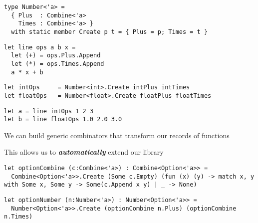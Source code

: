 \documentclass{beamer}
\begin{document}
\begin{frame}[fragile]
\begin{lstlisting}
type Number<'a> = 
  { Plus  : Combine<'a>
    Times : Combine<'a> }
  with static member Create p t = { Plus = p; Times = t }
\end{lstlisting}
\end{frame}

\begin{frame}[fragile]
\begin{lstlisting}
let line ops a b x =
  let (+) = ops.Plus.Append
  let (*) = ops.Times.Append
  a * x + b
\end{lstlisting}
\end{frame}

\begin{frame}[fragile]
\begin{lstlisting}
let intOps     = Number<int>.Create intPlus intTimes
let floatOps   = Number<float>.Create floatPlus floatTimes
\end{lstlisting}
\end{frame}

\begin{frame}[fragile]
\begin{lstlisting}
let a = line intOps 1 2 3
let b = line floatOps 1.0 2.0 3.0
\end{lstlisting}
\end{frame}

\begin{slide}{
\item We can build generic combinators that transform our records of functions
\item This allows us to \textbf{\textit{automatically}} extend our library
}\end{slide}

\begin{frame}[fragile]
\begin{lstlisting}
let optionCombine (c:Combine<'a>) : Combine<Option<'a>> = 
  Combine<Option<'a>>.Create (Some c.Empty) (fun (x) (y) -> match x, y with Some x, Some y -> Some(c.Append x y) | _ -> None)
\end{lstlisting}
\end{frame}

\begin{frame}[fragile]
\begin{lstlisting}
let optionNumber (n:Number<'a>) : Number<Option<'a>> = 
  Number<Option<'a>>.Create (optionCombine n.Plus) (optionCombine n.Times)
\end{lstlisting}
\end{frame}
\end{document}
